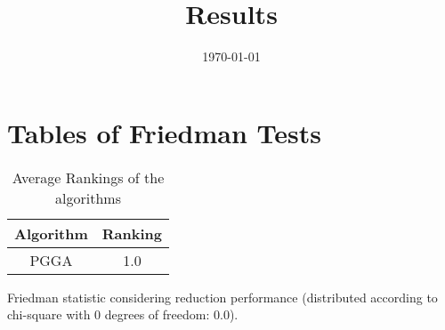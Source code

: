 \documentclass{article}
\title{Results}
\author{}
\date{\today}
\begin{document}
\oddsidemargin 0in \topmargin 0in\maketitle
\section{Tables of Friedman Tests}
\begin{table}[!htp]
\centering
\caption{Average Rankings of the algorithms
}\begin{tabular}{c|c}
Algorithm&Ranking\\
\hline
PGGA&1.0\\
\end{tabular}
\end{table}


Friedman statistic considering reduction performance (distributed according to chi-square with 0 degrees of freedom: 0.0).
\end{document}
